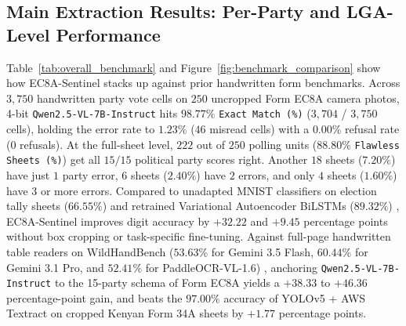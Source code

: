 \documentclass{article}
\begin{document}
\subsection{Main Extraction Results: Per-Party and LGA-Level Performance}

Table~\ref{tab:overall_benchmark} and Figure~\ref{fig:benchmark_comparison} show how EC8A-Sentinel stacks up against prior handwritten form benchmarks. Across $3,750$ handwritten party vote cells on $250$ uncropped Form EC8A camera photos, 4-bit \texttt{Qwen2.5-VL-7B-Instruct} hits $98.77\%$ \texttt{Exact Match (\%)} ($3,704$ / $3,750$ cells), holding the error rate to $1.23\%$ ($46$ misread cells) with a $0.00\%$ refusal rate ($0$ refusals). At the full-sheet level, $222$ out of $250$ polling units ($88.80\%$ \texttt{Flawless Sheets (\%)}) get all $15/15$ political party scores right. Another $18$ sheets ($7.20\%$) have just $1$ party error, $6$ sheets ($2.40\%$) have $2$ errors, and only $4$ sheets ($1.60\%$) have $3$ or more errors. Compared to unadapted MNIST classifiers on election tally sheets ($66.55\%$) and retrained Variational Autoencoder BiLSTMs ($89.32\%$) \cite{gondere2016election}, EC8A-Sentinel improves digit accuracy by $+32.22$ and $+9.45$ percentage points without box cropping or task-specific fine-tuning. Against full-page handwritten table readers on WildHandBench ($53.63\%$ for Gemini 3.5 Flash, $60.44\%$ for Gemini 3.1 Pro, and $52.41\%$ for PaddleOCR-VL-1.6) \cite{zhang2026wildhandbench}, anchoring \texttt{Qwen2.5-VL-7B-Instruct} to the 15-party schema of Form EC8A yields a $+38.33$ to $+46.36$ percentage-point gain, and beats the $97.00\%$ accuracy of YOLOv5 + AWS Textract on cropped Kenyan Form 34A sheets \cite{kimani2022using} by $+1.77$ percentage points.
\end{document}
